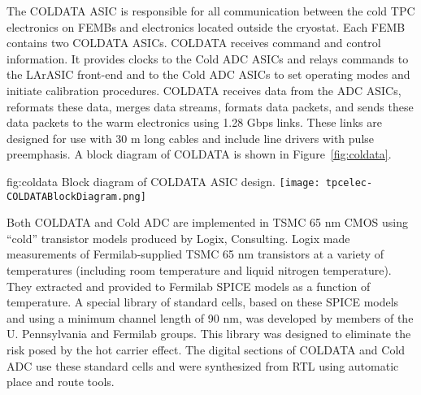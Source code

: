 The COLDATA ASIC is responsible for all communication between the cold TPC electronics on FEMBs and electronics located outside the cryostat.  Each FEMB contains two COLDATA ASICs. COLDATA receives command and control information.  It provides clocks to the Cold ADC ASICs and relays commands to the LArASIC front-end and to the Cold ADC ASICs to set operating modes and initiate calibration procedures.  COLDATA receives data from the ADC ASICs, reformats these data, merges data streams, formats data packets, and sends these data packets to the warm electronics using 1.28 Gbps links.  These links are designed for use with 30 m long cables and include line drivers with pulse preemphasis.  A block diagram of COLDATA is shown in Figure~\ref{fig:coldata}.  

\begin{dunefigure}
{fig:coldata}
{Block diagram of COLDATA ASIC design.}
\texttt{[image: tpcelec-COLDATABlockDiagram.png]}
\end{dunefigure}

Both COLDATA and Cold ADC are implemented in TSMC 65 nm CMOS using “cold” transistor models produced by Logix, Consulting.  Logix made measurements of Fermilab-supplied TSMC 65 nm transistors at a variety of temperatures (including room temperature and liquid nitrogen temperature).  They extracted and provided to Fermilab SPICE models as a function of temperature.  A special library of standard cells, based on these SPICE models and using a minimum channel length of 90 nm, was developed by members of the U. Pennsylvania and Fermilab groups.  This library was designed to eliminate the risk posed by the hot carrier effect.  The digital sections of COLDATA and Cold ADC use these standard cells and were synthesized from RTL using automatic place and route tools.
